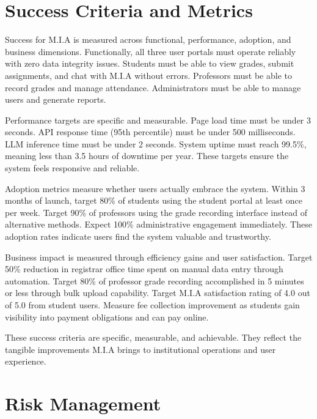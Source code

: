 \documentclass[12pt,a4paper]{report}
\begin{document}
\chapter{Success Criteria and Metrics}

Success for M.I.A is measured across functional, performance, adoption, and business dimensions. Functionally, all three user portals must operate reliably with zero data integrity issues. Students must be able to view grades, submit assignments, and chat with M.I.A without errors. Professors must be able to record grades and manage attendance. Administrators must be able to manage users and generate reports.

Performance targets are specific and measurable. Page load time must be under 3 seconds. API response time (95th percentile) must be under 500 milliseconds. LLM inference time must be under 2 seconds. System uptime must reach 99.5\%, meaning less than 3.5 hours of downtime per year. These targets ensure the system feels responsive and reliable.

Adoption metrics measure whether users actually embrace the system. Within 3 months of launch, target 80\% of students using the student portal at least once per week. Target 90\% of professors using the grade recording interface instead of alternative methods. Expect 100\% administrative engagement immediately. These adoption rates indicate users find the system valuable and trustworthy.

Business impact is measured through efficiency gains and user satisfaction. Target 50\% reduction in registrar office time spent on manual data entry through automation. Target 80\% of professor grade recording accomplished in 5 minutes or less through bulk upload capability. Target M.I.A satisfaction rating of 4.0 out of 5.0 from student users. Measure fee collection improvement as students gain visibility into payment obligations and can pay online.

These success criteria are specific, measurable, and achievable. They reflect the tangible improvements M.I.A brings to institutional operations and user experience.

\chapter{Risk Management}
\end{document}
